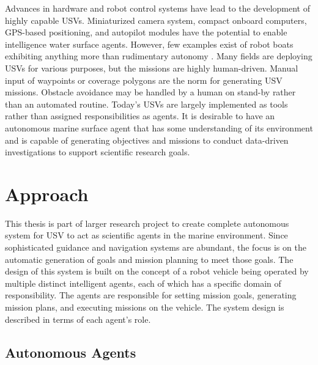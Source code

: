\documentclass{tamuccthesis}
\begin{document}
Advances in hardware and robot control systems have lead to the development of highly capable USVs. Miniaturized camera system, compact onboard computers, GPS-based positioning, and autopilot modules have the potential to enable intelligence water surface agents. However, few examples exist of robot boats exhibiting anything more than rudimentary autonomy \cite{bertram2008unmanned}. Many fields are deploying USVs for various purposes, but the missions are highly human-driven. Manual input of waypoints or coverage polygons are the norm for generating USV missions. Obstacle avoidance may be handled by a human on stand-by rather than an automated routine. Today's USVs are largely implemented as tools rather than assigned responsibilities as agents. It is desirable to have an autonomous marine surface agent that has some understanding of its environment and is capable of generating objectives and missions to conduct data-driven investigations to support scientific research goals.

\section{Approach}

This thesis is part of larger research project to create complete autonomous system for USV to act as scientific agents in the marine environment. Since sophisticated guidance and navigation systems are abundant, the focus is on the automatic generation of goals and mission planning to meet those goals. The design of this system is built on the concept of a robot vehicle being operated by multiple distinct intelligent agents, each of which has a specific domain of responsibility. The agents are responsible for setting mission goals, generating mission plans, and executing missions on the vehicle. The system design is described in terms of each agent's role. 

\subsection{Autonomous Agents}
\end{document}
